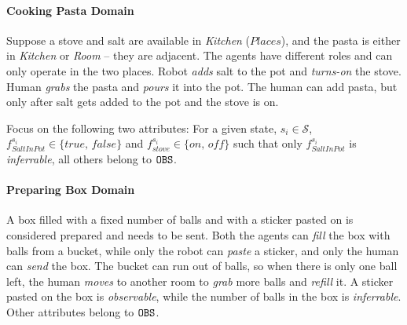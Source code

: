 \documentclass[letterpaper]{article} %
\begin{document}

\paragraph{Cooking Pasta Domain}
Suppose a stove and salt are available in \textit{Kitchen} ($\textit{Places}$), and the pasta is either in \textit{Kitchen} or \textit{Room} -- they are adjacent. The agents have different roles and can only operate in the two places. Robot \textit{adds} salt to the pot and \textit{turns-on} the stove. Human \textit{grabs} the pasta and \textit{pours} it into the pot. 
The human can add pasta, but only after salt gets added to the pot and the stove is {\sc on}.

Focus on the following two attributes: For a given state, $s_i \in \mathcal{S}$, $f_{\textit{SaltInPot}}^{s_i} \in \{\textit{true, false}\}$ and $f_{\textit{stove}}^{s_i} \in \{\textit{on, off}\}$ such that only 
$f_{\textit{SaltInPot}}^{s_i}$
is \textit{inferrable}, all others belong to $\texttt{OBS}$.

\paragraph{Preparing Box Domain}
A box filled with a fixed number of balls and with a sticker pasted on is considered prepared and needs to be sent. Both the agents can \textit{fill} the box with balls from a bucket, while only the robot can \textit{paste} a sticker, and only the human can \textit{send} the box. The bucket can run out of balls, so when there is only one ball left, the human \textit{moves} to another room to \textit{grab} more balls and \textit{refill} it. A sticker pasted on the box is \textit{observable}, while the number of balls in the box is \textit{inferrable}. 
Other attributes belong to $\texttt{OBS}$.   
\end{document}
